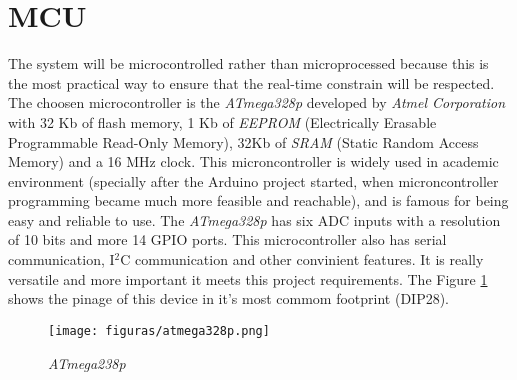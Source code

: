 \section{MCU}
		The system will be microcontrolled rather than microprocessed because this is the most practical way to ensure that the real-time constrain will be respected. The choosen microcontroller is the \textit{ATmega328p} developed by \textit{Atmel Corporation} with 32 Kb of flash memory, 1 Kb of \textit{EEPROM} (Electrically Erasable Programmable Read-Only Memory), 32Kb of \textit{SRAM} (Static Random Access Memory) and a 16 MHz clock. This microncontroller is widely used in academic environment (specially after the Arduino project started, when microncontroller programming became much more feasible and reachable), and is famous for being easy and reliable to use. The \textit{ATmega328p} has six ADC inputs with a resolution of 10 bits and more 14 GPIO ports. This microcontroller also has serial communication, I$^2$C communication and other convinient features. It is really versatile and more important it meets this project requirements. The Figure \ref{fig-atmega328p} shows the pinage of this device in it's most commom footprint (DIP28).

		\begin{figure}[htbp]
			\centering
			\texttt{[image: figuras/atmega328p.png]}
			\caption{\textit{ATmega238p} \cite{coorporation2011atmel}}
			\label{fig-atmega328p}
		\end{figure}
	